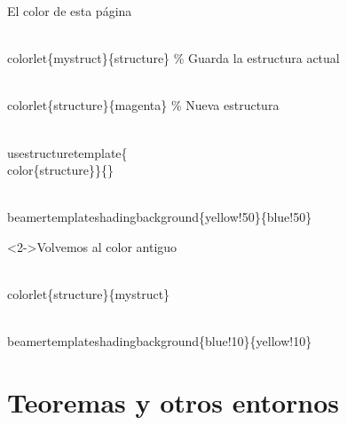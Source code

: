 \documentclass[11pt]{beamer}
\begin{document}
\usestructuretemplate{\color{structure}}{} %
\begin{frame}

\begin{block}{El color de esta p\'agina}
\begin{semiverbatim}\scriptsize
\\colorlet\{mystruct\}\{structure\} \% Guarda la estructura actual

\\colorlet\{structure\}\{magenta\} \% Nueva estructura

\\usestructuretemplate\{\\color\{structure\}\}\{\} %

\\beamertemplateshadingbackground\{yellow!50\}\{blue!50\} %
\end{semiverbatim}
\end{block}

\begin{block}<2->{Volvemos al color antiguo}
\begin{semiverbatim}\scriptsize
\\colorlet\{structure\}\{mystruct\}

\\beamertemplateshadingbackground\{blue!10\}\{yellow!10\}
\end{semiverbatim}
\end{block}

\end{frame}


\section{Teoremas y otros entornos}
\end{document}
